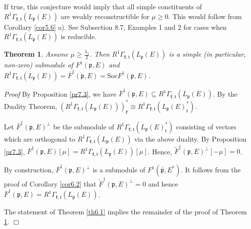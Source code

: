 \documentclass[11pt]{amsart}
\newcounter{theorem}
\newtheorem{theo}{Theorem}[section]
\renewenvironment{proof}{ \emph{Proof}}{$\Box$}
\renewcommand{\tt}{\mathfrak{t}}
\newcommand{\kk}{\mathfrak{k}}
\newcommand{\pp}{\mathfrak{p}}
\newcommand{\refth}[1]{Theorem \ref{#1}}
\newcommand{\refcor}[1]{Corollary \ref{#1}}
\newcommand{\refprop}[1]{Proposition \ref{#1}}
\newcommand{\Soc}{\mathrm{Soc}}
\begin{document}
If true, this conjecture would imply that all simple constituents of $R^1\Gamma_{\kk,\tt}(L_\pp(E))$ are weakly reconstructible for $\mu\geq 0$. This would follow from \refcor{cor5.6} a). See Subsection 8.7, Examples 1 and 2 for cases when $R^1\Gamma_{\kk,\tt}(L_\pp(E))$ is reducible.
\begin{theo}\label{th7.4}
Assume $\mu\geq\frac{\lambda_1}{2}$. Then $R^1\Gamma_{\kk,\tt}(L_\pp(E))$ is a simple (in particular, non-zero) submodule of $F^1(\pp,E)$ and $R^1\Gamma_{\kk,\tt}(L_\pp(E))=\bar{F}^1(\pp,E)=\Soc F^1(\pp,E)$.
\end{theo}
\begin{proof}
By \refprop{pr7.3}, we have $\bar{F}^1(\pp,E)\subseteq R^1\Gamma_{\kk,\tt}(L_\pp(E))$. By the Duality Theorem, $(R^1\Gamma_{\kk,\tt}(L_\pp(E)))^*_\kk\cong R^1\Gamma_{\kk,\tt}(L_\pp(E)^*_\tt)$.

Let $\bar{F}^1(\pp,E)^\perp$ be the submodule of $R^1\Gamma_{\kk,\tt}(L_\pp(E)^*_\tt)$ consisting of vectors which are orthogonal to $R^1\Gamma_{\kk,\tt}(L_\pp(E))$ via the above duality. By \refprop{pr7.3}, $\bar{F}^1(\pp,E)[\mu]=R^1\Gamma_{\kk,\tt}(L_\pp(E))[\mu]$. Hence, $\tilde{F}^1(\pp,E)^\perp[-\mu]=0$.

By construction, $\bar{F}^1(\pp,E)^\perp$ is a submodule of $F^1(\bar{\pp},E^*)$. It follows from the proof of \refcor{cor6.2} that $\tilde{F}^1(\pp,E)^\perp=0$ and hence $\bar{F}^1(\pp,E)=R^1\Gamma_{\kk,\tt}(L_\pp(E))$.

The statement of \refth{th6.1} implies the remainder of the proof of \refth{th7.4}.
\end{proof}
\end{document}
